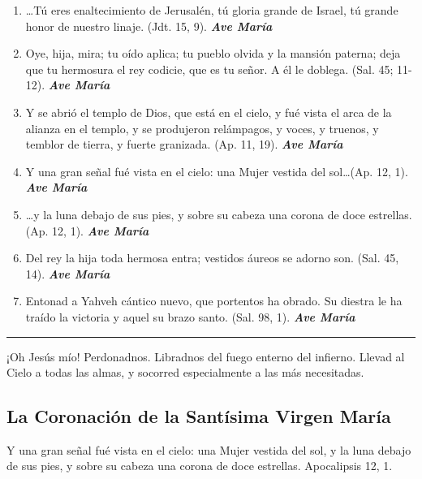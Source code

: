 \documentclass[a4paper,11pt, oneside]{report}
\begin{document}
{{\begin{enumerate}
        \item {\ldots}Tú eres enaltecimiento de Jerusalén, tú gloria grande de Israel, tú grande honor de nuestro linaje. (Jdt. 15, 9). \textbf{\textit{Ave María}}

        \item Oye, hija, mira; tu oído aplica; tu pueblo olvida y la mansión paterna; deja que tu hermosura
        el rey codicie, que es tu señor. A él le doblega. (Sal. 45; 11-12). \textbf{\textit{Ave María}}

        \item Y se abrió el templo de Dios, que está en el cielo, y fué vista el arca de la alianza en el templo,
        y se produjeron relámpagos, y voces, y truenos, y temblor de tierra, y fuerte granizada. (Ap. 11, 19). \textbf{\textit{Ave María}}

        \item Y una gran señal fué vista en el cielo: una Mujer vestida del sol\ldots (Ap. 12, 1). \textbf{\textit{Ave María}}

        \item {\ldots}y la luna debajo de sus pies, y sobre su cabeza una corona de doce estrellas. (Ap. 12, 1). \textbf{\textit{Ave María}}

        \item Del rey la hija toda hermosa entra; vestidos áureos se adorno son. (Sal. 45, 14). \textbf{\textit{Ave María}}

        \item Entonad a Yahveh cántico nuevo, que portentos ha obrado. Su diestra le ha traído la victoria y aquel su brazo santo. (Sal. 98, 1). \textbf{\textit{Ave María}}

      \end{enumerate}      

      \begin{center}\rule{1\linewidth}{\linethickness}\end{center}      

      \medskip
      \hypertarget{finalAsuncion}{¡Oh Jesús mío! Perdonadnos. Libradnos del fuego enterno del infierno. Llevad al Cielo a todas las almas, y socorred especialmente a las más 
      necesitadas.}
    }

  \subsection*{La Coronación de la Santísima Virgen María}
    {
      Y una gran señal fué vista en el cielo: una Mujer vestida del sol, y la luna debajo de sus pies, y sobre su cabeza una corona de doce estrellas.
      Apocalipsis 12, 1.

}}
\end{document}

